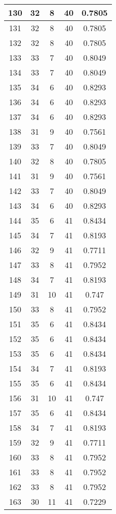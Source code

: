 \documentclass[letterpaper, 12pt]{article}
\begin{document}
\begin{longtable}{|c|c|c|c|c|}
\hline
130 & 32 & 8 & 40 & 0.7805 \\
\hline
131 & 32 & 8 & 40 & 0.7805 \\
\hline
132 & 32 & 8 & 40 & 0.7805 \\
\hline
133 & 33 & 7 & 40 & 0.8049 \\
\hline
134 & 33 & 7 & 40 & 0.8049 \\
\hline
135 & 34 & 6 & 40 & 0.8293 \\
\hline
136 & 34 & 6 & 40 & 0.8293 \\
\hline
137 & 34 & 6 & 40 & 0.8293 \\
\hline
138 & 31 & 9 & 40 & 0.7561 \\
\hline
139 & 33 & 7 & 40 & 0.8049 \\
\hline
140 & 32 & 8 & 40 & 0.7805 \\
\hline
141 & 31 & 9 & 40 & 0.7561 \\
\hline
142 & 33 & 7 & 40 & 0.8049 \\
\hline
143 & 34 & 6 & 40 & 0.8293 \\
\hline
144 & 35 & 6 & 41 & 0.8434 \\
\hline
145 & 34 & 7 & 41 & 0.8193 \\
\hline
146 & 32 & 9 & 41 & 0.7711 \\
\hline
147 & 33 & 8 & 41 & 0.7952 \\
\hline
148 & 34 & 7 & 41 & 0.8193 \\
\hline
149 & 31 & 10 & 41 & 0.747 \\
\hline
150 & 33 & 8 & 41 & 0.7952 \\
\hline
151 & 35 & 6 & 41 & 0.8434 \\
\hline
152 & 35 & 6 & 41 & 0.8434 \\
\hline
153 & 35 & 6 & 41 & 0.8434 \\
\hline
154 & 34 & 7 & 41 & 0.8193 \\
\hline
155 & 35 & 6 & 41 & 0.8434 \\
\hline
156 & 31 & 10 & 41 & 0.747 \\
\hline
157 & 35 & 6 & 41 & 0.8434 \\
\hline
158 & 34 & 7 & 41 & 0.8193 \\
\hline
159 & 32 & 9 & 41 & 0.7711 \\
\hline
160 & 33 & 8 & 41 & 0.7952 \\
\hline
161 & 33 & 8 & 41 & 0.7952 \\
\hline
162 & 33 & 8 & 41 & 0.7952 \\
\hline
163 & 30 & 11 & 41 & 0.7229 \\

\end{longtable}
\end{document}
